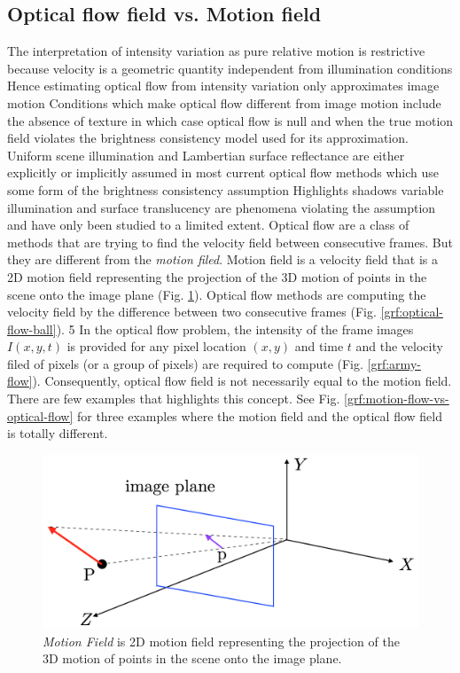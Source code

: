 \documentclass[letterpaper,11pt]{article}
\begin{document}
\subsection{Optical flow field vs. Motion field}
The interpretation of intensity variation as pure relative motion is restrictive because velocity is a geometric quantity independent from illumination conditions Hence estimating optical flow from intensity variation only approximates image motion Conditions which make optical flow different from image motion include the absence of texture in which case optical flow is null and when the true motion field violates the brightness consistency model used for its approximation. Uniform scene illumination and Lambertian surface reflectance are either explicitly or implicitly assumed in most current optical flow methods which use some form of the brightness consistency assumption Highlights shadows variable illumination and surface translucency are phenomena violating the assumption and have only been studied to a limited extent.
Optical flow are a class of methods that are trying to find the velocity field between consecutive frames. But they are different from the \emph{motion filed}. Motion field is a velocity field that is a 2D motion field representing the projection of the 3D motion of points in the scene onto the image plane (Fig. \ref{grf:motion-field}). Optical flow methods are computing the velocity field by the difference between two consecutive frames (Fig. \ref{grf:optical-flow-ball}). 5 In the optical flow problem, the intensity of the frame images $I(x,y,t)$ is provided for any pixel location $(x,y)$ and time $t$ and the velocity filed of pixels (or a group of pixels) are required to compute (Fig. \ref{grf:army-flow}). Consequently, optical flow field is not necessarily equal to the motion field. There are few examples that highlights this concept. See Fig. \ref{grf:motion-flow-vs-optical-flow} for three examples where the motion field and the optical flow field is totally different. 

\begin{figure}[ht!]
	\centering
	\includegraphics[width=.7\textwidth]{grf/motion-field.png}
	\caption{\emph{Motion Field} is 2D motion field representing the projection of the 3D motion of points in the scene onto the image plane.}
	\label{grf:motion-field}
\end{figure}
\end{document}
